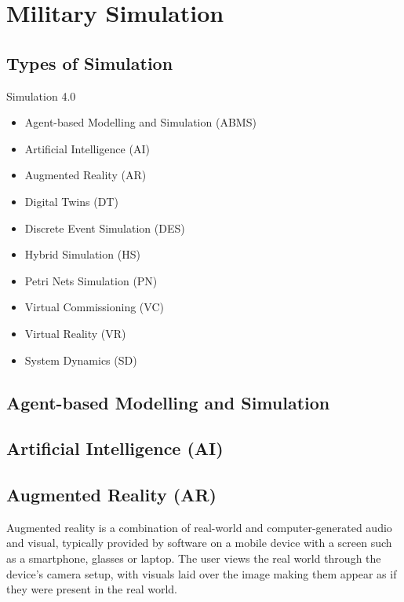 \documentclass{article}
\begin{document}
\section{Military Simulation}

\subsection{Types of Simulation}

Simulation 4.0 \cite{DEPAULAFERREIRA2020106868}

\begin{itemize}
    \item Agent-based Modelling and Simulation (ABMS)
    \item Artificial Intelligence (AI)
    \item Augmented Reality (AR)
    \item Digital Twins (DT)
    \item Discrete Event Simulation (DES)
    \item Hybrid Simulation (HS)
    \item Petri Nets Simulation (PN)
    \item Virtual Commissioning (VC)
    \item Virtual Reality (VR)    
    \item System Dynamics (SD)    
\end{itemize}

\subsection{Agent-based Modelling and Simulation}

\subsection{Artificial Intelligence (AI)}

\subsection{Augmented Reality (AR)}

Augmented reality is a combination of real-world and computer-generated audio and visual, typically provided by software on a mobile device with a screen such as a smartphone, glasses or laptop. The user views the real world through the device's camera setup, with visuals laid over the image making them appear as if they were present in the real world. 
\end{document}
